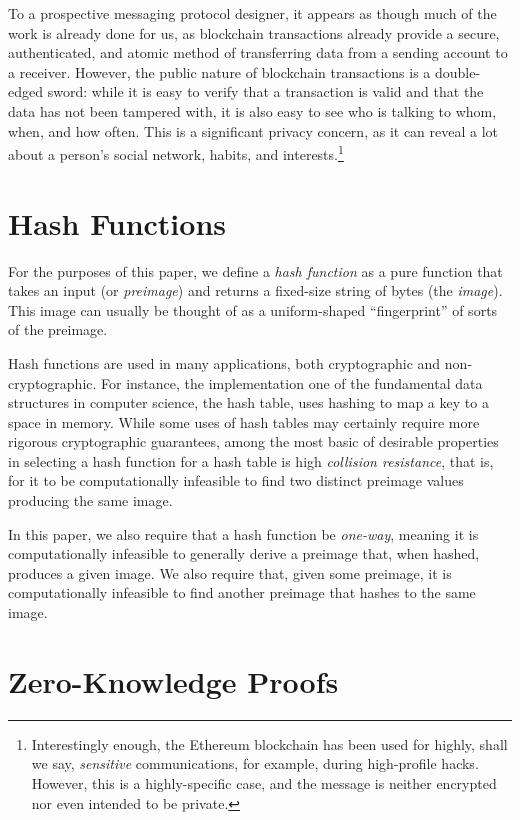 To a prospective messaging protocol designer, it appears as though much of the work is already done for us, as blockchain transactions already provide a secure, authenticated, and atomic method of transferring data from a sending account to a receiver. However, the public nature of blockchain transactions is a double-edged sword: while it is easy to verify that a transaction is valid and that the data has not been tampered with, it is also easy to see who is talking to whom, when, and how often. This is a significant privacy concern, as it can reveal a lot about a person's social network, habits, and interests.\footnote{Interestingly enough, the Ethereum blockchain has been used for highly, shall we say, \emph{sensitive} communications, for example, during high-profile hacks. \parencite{etherscanio_hackermessage_2023} However, this is a highly-specific case, and the message is neither encrypted nor even intended to be private.}

\section{Hash Functions}\label{hash-functions}

For the purposes of this paper, we define a \emph{hash function} as a pure function that takes an input (or \emph{preimage}) and returns a fixed-size string of bytes (the \emph{image}). This image can usually be thought of as a uniform-shaped ``fingerprint'' of sorts of the preimage.

Hash functions are used in many applications, both cryptographic and non-cryptographic. For instance, the implementation one of the fundamental data structures in computer science, the hash table, uses hashing to map a key to a space in memory. While some uses of hash tables may certainly require more rigorous cryptographic guarantees, among the most basic of desirable properties in selecting a hash function for a hash table is high \emph{collision resistance}, that is, for it to be computationally infeasible to find two distinct preimage values producing the same image.

In this paper, we also require that a hash function be \emph{one-way}, meaning it is computationally infeasible to generally derive a preimage that, when hashed, produces a given image. We also require that, given some preimage, it is computationally infeasible to find another preimage that hashes to the same image.

\section{Zero-Knowledge Proofs}\label{zero-knowledge-proofs}

